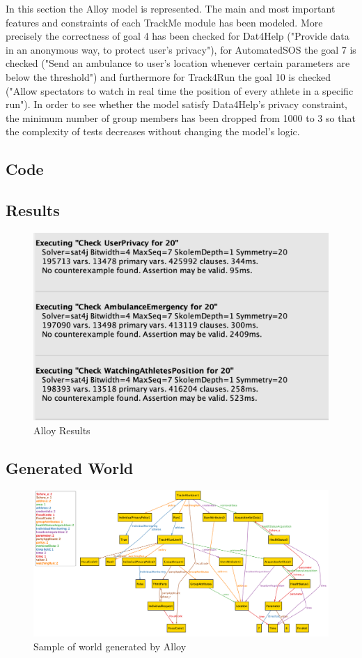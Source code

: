 In this section the Alloy model is represented. The main and most important features and constraints of each TrackMe module has been modeled. More precisely the correctness of goal 4 has been checked for Dat4Help ("Provide data in an anonymous way, to protect user’s privacy"), for AutomatedSOS the goal 7 is checked ("Send an ambulance to user’s location whenever certain parameters are below the threshold") and furthermore for Track4Run the goal 10 is checked ("Allow spectators to watch in real time the position of every athlete in a specific run").
\bigbreak
\noindent
In order to see whether the model satisfy Data4Help's privacy constraint, the minimum number of group members has been dropped from 1000 to 3 so that the complexity of tests decreases without changing the model's logic. 

\subsection{Code}

\subsection{Results}
\begin{figure}[H]
\centering
\includegraphics[scale=0.7]{Images/alloyResult.png}
\caption{Alloy Results}
\end{figure}
\subsection{Generated World}
\begin{figure}[H]
\centering
\includegraphics[scale=0.4]{Images/alloyGeneratedWorld.png}
\caption{Sample of world generated by Alloy}
\end{figure}